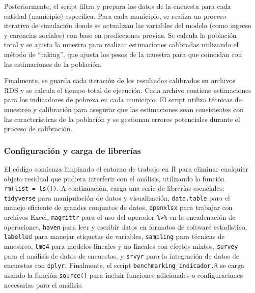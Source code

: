 \documentclass[
  12pt,
]{book}
\begin{document}
Posteriormente, el script filtra y prepara los datos de la encuesta para cada entidad (municipio) específica. Para cada municipio, se realiza un proceso iterativo de simulación donde se actualizan las variables del modelo (como ingreso y carencias sociales) con base en predicciones previas. Se calcula la población total y se ajusta la muestra para realizar estimaciones calibradas utilizando el método de ``raking'', que ajusta los pesos de la muestra para que coincidan con las estimaciones de la población.

Finalmente, se guarda cada iteración de los resultados calibrados en archivos RDS y se calcula el tiempo total de ejecución. Cada archivo contiene estimaciones para los indicadores de pobreza en cada municipio. El script utiliza técnicas de muestreo y calibración para asegurar que las estimaciones sean consistentes con las características de la población y se gestionan errores potenciales durante el proceso de calibración.

\hypertarget{configuraciuxf3n-y-carga-de-libreruxedas}{%
\subsubsection*{Configuración y carga de librerías}\label{configuraciuxf3n-y-carga-de-libreruxedas}}

El código comienza limpiando el entorno de trabajo en R para eliminar cualquier objeto residual que pudiera interferir con el análisis, utilizando la función \texttt{rm(list\ =\ ls())}. A continuación, carga una serie de librerías esenciales: \texttt{tidyverse} para manipulación de datos y visualización, \texttt{data.table} para el manejo eficiente de grandes conjuntos de datos, \texttt{openxlsx} para trabajar con archivos Excel, \texttt{magrittr} para el uso del operador \texttt{\%\textgreater{}\%} en la encadenación de operaciones, \texttt{haven} para leer y escribir datos en formatos de software estadístico, \texttt{labelled} para manejar etiquetas de variables, \texttt{sampling} para técnicas de muestreo, \texttt{lme4} para modelos lineales y no lineales con efectos mixtos, \texttt{survey} para el análisis de datos de encuestas, y \texttt{srvyr} para la integración de datos de encuestas con \texttt{dplyr}. Finalmente, el script \texttt{benchmarking\_indicador.R} se carga usando la función \texttt{source()} para incluir funciones adicionales o configuraciones necesarias para el análisis.
\end{document}
